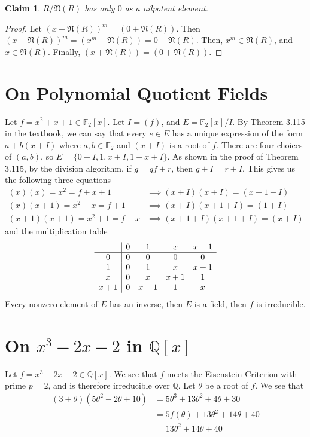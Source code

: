 \documentclass[12pt]{article}
\newtheorem*{claim*}{Claim}
\newcommand*{\Q}{\mathbb{Q}}
\newcommand*{\F}{\mathbb{F}}
\newcommand*{\nil}{\mathfrak{N}}
\begin{document}
\begin{claim*}
$R/\nil(R)$ has only $0$ as a nilpotent element.
\end{claim*}
\begin{proof}
Let $(x + \nil(R)) ^ m = (0 + \nil(R))$. Then $(x + \nil(R))^m = (x ^ m + \nil(R)) = 0 + \nil(R)$.
Then, $x^m \in \nil(R)$, and $x \in \nil(R)$. Finally, $(x + \nil(R)) = (0 + \nil(R))$. 
\end{proof}


\section{On Polynomial Quotient Fields}
Let $f = x^2  + x + 1 \in \F_2[x]$. Let $I = (f)$, and $E = \F_2[x] / I$. By Theorem 3.115 in the textbook, we can say that every $e \in E$ has a unique expression of the form $a + b(x + I)$ where $a,b \in \F_2$ and $(x + I)$ is a root of $f$. There are four choices of $(a, b)$, so $E = \{0 + I, 1, x + I, 1 + x + I\}$. As shown in the proof of Theorem 3.115, by the division algorithm, if $g = qf + r$, then $g + I = r + I$. This gives us the following three equations
\begin{align*}
(x)(x) = x^2 = f + x + 1 &\implies (x + I)(x + I) = (x + 1 + I)\\
(x)(x + 1) = x^2 + x = f + 1 &\implies (x + I)(x + 1 + I) = (1 + I)\\
(x + 1)(x + 1) = x^2 + 1 = f + x &\implies (x + 1 + I)(x + 1 + I) = (x + I)
\end{align*}
\noindent and the multiplication table
\[
\begin{array}{c | c c c c}
      & 0 & 1 & x& x + 1\\\hline
0     & 0 & 0     & 0     & 0\\
1     & 0 & 1     & x     & x + 1\\
x     & 0 & x     & x + 1 & 1\\
x + 1 & 0 & x + 1 & 1     & x
\end{array}
\]
Every nonzero element of $E$ has an inverse, then $E$ is a field, then $f$ is irreducible.

\section{On $x^3 - 2x - 2$ in $\Q[x]$}
Let $f = x^3 - 2x - 2 \in \Q[x]$. We see that $f$ meets the Eisenstein Criterion with prime $p = 2$, and is therefore irreducible over $\Q$. Let $\theta$ be a root of $f$. We see that 
\begin{align*}
(3 + \theta)(5 \theta^2 -2\theta + 10) &= 5\theta^3 + 13 \theta^2 + 4\theta + 30\\
&= 5f(\theta) + 13\theta^2 + 14\theta + 40\\
&= 13\theta^2 + 14\theta + 40
\end{align*}
\end{document}
